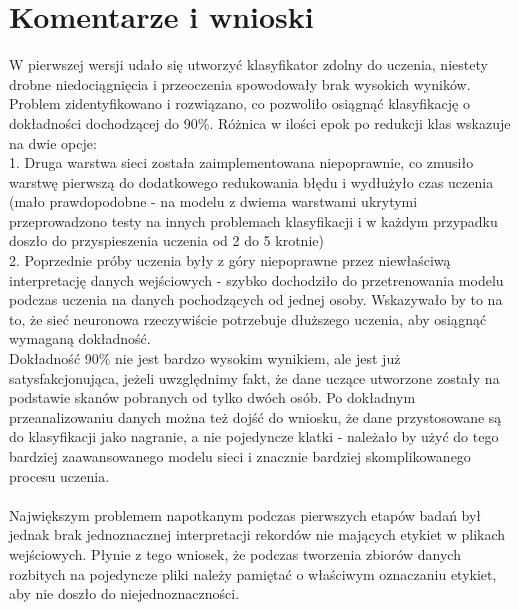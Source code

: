 \documentclass[a4paper,12pt]{article}
\begin{document}
\section{Komentarze i wnioski}
\hspace{1cm}W pierwszej wersji udało się utworzyć klasyfikator zdolny do uczenia, niestety drobne niedociągnięcia i przeoczenia spowodowały brak wysokich wyników. Problem zidentyfikowano i rozwiązano, co pozwoliło osiągnąć klasyfikację o dokładności dochodzącej do 90\%. Różnica w ilości epok po redukcji klas wskazuje na dwie opcje:\\
1. Druga warstwa sieci została zaimplementowana niepoprawnie, co zmusiło warstwę pierwszą do dodatkowego redukowania błędu i wydłużyło czas uczenia (mało prawdopodobne - na modelu z dwiema warstwami ukrytymi przeprowadzono testy na innych problemach klasyfikacji i w każdym przypadku doszło do przyspieszenia uczenia od 2 do 5 krotnie)\\
2. Poprzednie próby uczenia były z góry niepoprawne przez niewłaściwą interpretację danych wejściowych - szybko dochodziło do przetrenowania modelu podczas uczenia na danych pochodzących od jednej osoby. Wskazywało by to na to, że sieć neuronowa rzeczywiście potrzebuje dłuższego uczenia, aby osiągnąć wymaganą dokładność.\\
Dokładność 90\% nie jest bardzo wysokim wynikiem, ale jest już satysfakcjonująca, jeżeli uwzględnimy fakt, że dane uczące utworzone zostały na podstawie skanów pobranych od tylko dwóch osób. Po dokładnym przeanalizowaniu danych można też dojść do wniosku, że dane przystosowane są do klasyfikacji jako nagranie, a nie pojedyncze klatki - należało by użyć do tego bardziej zaawansowanego modelu sieci i znacznie bardziej skomplikowanego procesu uczenia.\\\\
\hspace{1cm}Największym problemem napotkanym podczas pierwszych etapów badań był jednak brak jednoznacznej interpretacji rekordów nie mających etykiet w plikach wejściowych. Płynie z tego wniosek, że podczas tworzenia zbiorów danych rozbitych na pojedyncze pliki należy pamiętać o właściwym oznaczaniu etykiet, aby nie doszło do niejednoznaczności.
\end{document}
